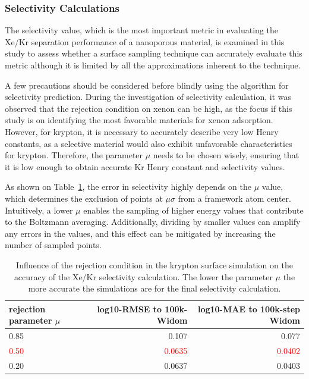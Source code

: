 \documentclass[main]{subfiles}
\begin{document}
\subsubsection{Selectivity Calculations}

The selectivity value, which is the most important metric in evaluating the Xe/Kr separation performance of a nanoporous material, is examined in this study to assess whether a surface sampling technique can accurately evaluate this metric although it is limited by all the approximations inherent to the technique. 

A few precautions should be considered before blindly using the algorithm for selectivity prediction. During the investigation of selectivity calculation, it was observed that the rejection condition on xenon can be high, as the focus if this study is on identifying the most favorable materials for xenon adsorption. However, for krypton, it is necessary to accurately describe very low Henry constants, as a selective material would also exhibit unfavorable characteristics for krypton. Therefore, the parameter $\mu$ needs to be chosen wisely, ensuring that it is low enough to obtain accurate Kr Henry constant and selectivity values. 

As shown on Table~\ref{tab:selec_prob}, the error in selectivity highly depends on the $\mu$ value, which determines the exclusion of points at $\mu\sigma$ from a framework atom center. Intuitively, a lower $\mu$ enables the sampling of higher energy values that contribute to the Boltzmann averaging. Additionally, dividing by smaller values can amplify any errors in the values, and this effect can be mitigated by increasing the number of sampled points.

\begin{table}[ht]
  \setlength{\extrarowheight}{1pt}
  \centering
  \begin{tabular}{|l|r|r|}
  \hline
    rejection parameter $\mu$ &  log10-RMSE to 100k-Widom &   log10-MAE to 100k-step Widom \\
  \hline
      0.85 &      0.107 &   0.077 \\
      \textcolor{red}{0.50} &      \textcolor{red}{0.0635} &   \textcolor{red}{0.0402} \\
      0.20 &      0.0637 &   0.0403 \\
  \hline
  \end{tabular}
  \caption{Influence of the rejection condition in the krypton surface simulation on the accuracy of the Xe/Kr selectivity calculation. The lower the parameter $\mu$ the more accurate the simulations are for the final selectivity calculation.}\label{tab:selec_prob}
\end{table}
\end{document}
